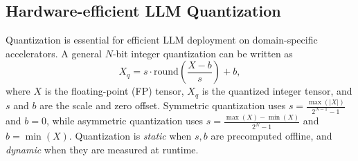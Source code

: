 \documentclass[conference]{IEEEtran}
\begin{document}
\subsection{Hardware-efficient LLM Quantization}


Quantization is essential for efficient LLM deployment on domain-specific accelerators. A general $N$-bit integer quantization can be written as
\[
X_q = s \cdot \text{round}\left(\frac{X - b}{s}\right) + b,
\]
where $X$ is the floating-point (FP) tensor, $X_q$ is the quantized integer tensor, and $s$ and $b$ are the scale and zero offset. Symmetric quantization uses $s = \frac{\max(|X|)}{2^{N-1}-1}$ and $b = 0$, while asymmetric quantization uses $s = \frac{\max(X) - \min(X)}{2^{N}-1}$ and $b = \min(X)$. Quantization is \emph{static} when $s,b$ are precomputed offline, and \emph{dynamic} when they are measured at runtime.
\end{document}
